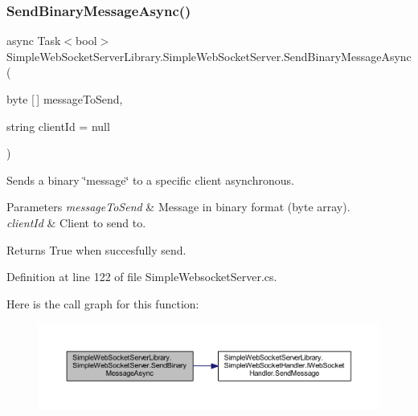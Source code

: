 \subsubsection{\texorpdfstring{Send\+Binary\+Message\+Async()}{SendBinaryMessageAsync()}}
{\footnotesize\ttfamily async Task$<$bool$>$ Simple\+Web\+Socket\+Server\+Library.\+Simple\+Web\+Socket\+Server.\+Send\+Binary\+Message\+Async (\begin{DoxyParamCaption}\item[{byte \mbox{[}$\,$\mbox{]}}]{message\+To\+Send,  }\item[{string}]{client\+Id = {\ttfamily null} }\end{DoxyParamCaption})}



Sends a binary \char`\"{}message\char`\"{} to a specific client asynchronous. 


\begin{DoxyParams}{Parameters}
{\em message\+To\+Send} & Message in binary format (byte array).\\
\hline
{\em client\+Id} & Client to send to.\\
\hline
\end{DoxyParams}
\begin{DoxyReturn}{Returns}
True when succesfully send.
\end{DoxyReturn}


Definition at line 122 of file Simple\+Websocket\+Server.\+cs.

Here is the call graph for this function\+:
\nopagebreak
\begin{figure}[H]
\begin{center}
\leavevmode
\includegraphics[width=350pt]{class_simple_web_socket_server_library_1_1_simple_web_socket_server_a9d94bdf3e2964c65cafc62a80102a28c_cgraph}
\end{center}
\end{figure}
\mbox{\label{class_simple_web_socket_server_library_1_1_simple_web_socket_server_ab47f01467513ad98f0d9de69d41e12a5}} 
